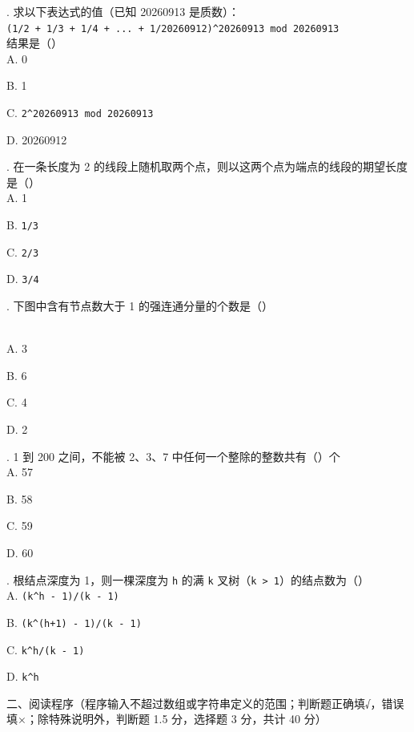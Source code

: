 \documentclass[a4paper]{ctexart}
\newcommand{\bigtitle}[1]{\noindent\heiti #1\par\vspace{2pt}}
\newcommand{\q}[1]{\noindent #1}
\newcommand{\opt}[1]{\hspace*{2em} #1\par}
\begin{document}
\q{11.} 求以下表达式的值（已知 20260913 是质数）：\\
\hspace*{1.5em}\texttt{(1/2 + 1/3 + 1/4 + ... + 1/20260912)\^{}20260913 mod 20260913}\\
结果是（\qquad）\\
\opt{A. 0}
\opt{B. 1}
\opt{C. \texttt{2\^{}20260913 mod 20260913}}
\opt{D. 20260912}

\q{12.} 在一条长度为 2 的线段上随机取两个点，则以这两个点为端点的线段的期望长度是（\qquad）\\
\opt{A. 1}
\opt{B. \texttt{1/3}}
\opt{C. \texttt{2/3}}
\opt{D. \texttt{3/4}}

\q{13.} 下图中含有节点数大于 1 的强连通分量的个数是（\qquad）\\\\
\begin{center}
\end{center}
\opt{A. 3}
\opt{B. 6}
\opt{C. 4}
\opt{D. 2}

\q{14.} 1 到 200 之间，不能被 2、3、7 中任何一个整除的整数共有（\qquad）个\\
\opt{A. 57}
\opt{B. 58}
\opt{C. 59}
\opt{D. 60}

\q{15.} 根结点深度为 1，则一棵深度为 \texttt{h} 的满 \texttt{k} 叉树（\texttt{k > 1}）的结点数为（\qquad）\\
\opt{A. \texttt{(k\^{}h - 1)/(k - 1)}}
\opt{B. \texttt{(k\^{}(h+1) - 1)/(k - 1)}}
\opt{C. \texttt{k\^{}h/(k - 1)}}
\opt{D. \texttt{k\^{}h}}

\clearpage
\bigtitle{二、阅读程序（程序输入不超过数组或字符串定义的范围；判断题正确填√，错误填×；除特殊说明外，判断题 1.5 分，选择题 3 分，共计 40 分）}
\end{document}

